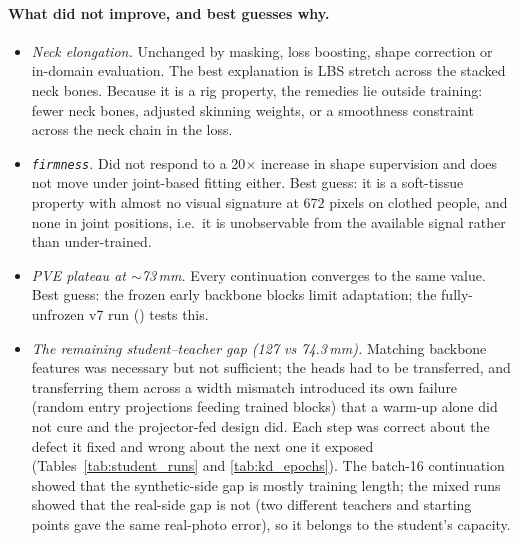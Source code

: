 \paragraph{What did not improve, and best guesses why.}
\begin{itemize}
  \item \emph{Neck elongation.} Unchanged by masking, loss boosting, shape
        correction or in-domain evaluation. The best explanation is LBS stretch
        across the stacked neck bones. Because it is a rig property, the
        remedies lie outside training: fewer neck bones, adjusted skinning
        weights, or a smoothness constraint across the neck chain in the loss.
  \item \emph{\texttt{firmness}.} Did not respond to a 20$\times$ increase in
        shape supervision and does not move under joint-based fitting either.
        Best guess: it is a soft-tissue property with almost no visual
        signature at $672$ pixels on clothed people, and none in joint
        positions, i.e.\ it is unobservable from the available signal rather
        than under-trained.
  \item \emph{PVE plateau at $\sim$73\,mm.} Every continuation converges to the
        same value. Best guess: the frozen early backbone blocks limit
        adaptation; the fully-unfrozen v7 run (\TODO{}) tests this.
  \item \emph{The remaining student--teacher gap (127 vs 74.3\,mm).}
        Matching backbone features was necessary but not sufficient; the
        heads had to be transferred, and transferring them across a width
        mismatch introduced its own failure (random entry projections feeding
        trained blocks) that a warm-up alone did not cure and the
        projector-fed design did. Each step was correct about the defect it
        fixed and wrong about the next one it exposed
        (Tables~\ref{tab:student_runs} and \ref{tab:kd_epochs}). The batch-16
        continuation showed that the synthetic-side gap is mostly training
        length; the mixed runs showed that the real-side gap is not (two
        different teachers and starting points gave the same real-photo
        error), so it belongs to the student's capacity.
\end{itemize}

